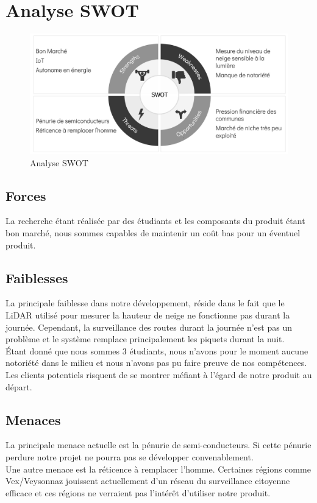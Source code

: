 \section{Analyse SWOT}
\begin{figure}[H]
    \centering
    \includegraphics[width=0.85\linewidth]{Images/business/swot.PNG}
    \caption[]{Analyse SWOT}
    \label{fig:swot}
\end{figure}

\subsection{Forces}
La recherche étant réalisée par des étudiants et les composants du produit étant
bon marché, nous sommes capables de maintenir un coût bas pour un éventuel produit.

\subsection{Faiblesses}
La principale faiblesse dans notre développement, réside dans le fait que le LiDAR utilisé pour mesurer
la hauteur de neige ne fonctionne pas durant la journée.
Cependant, la surveillance des routes durant la journée n'est pas un problème et le
système remplace principalement les piquets durant la nuit.\\
Étant donné que nous sommes 3 étudiants, nous n'avons pour le moment aucune notoriété dans
le milieu et nous n'avons pas pu faire preuve de nos compétences. Les clients potentiels
risquent de se montrer méfiant à l'égard de notre produit au départ.

\subsection{Menaces}
La principale menace actuelle est la pénurie de semi-conducteurs. Si cette pénurie perdure
notre projet ne pourra pas se développer convenablement.\\
Une autre menace est la réticence à remplacer l'homme. Certaines régions comme Vex/Veysonnaz
jouissent actuellement d'un réseau du surveillance citoyenne efficace et ces régions
ne verraient pas l'intérêt d'utiliser notre produit.

